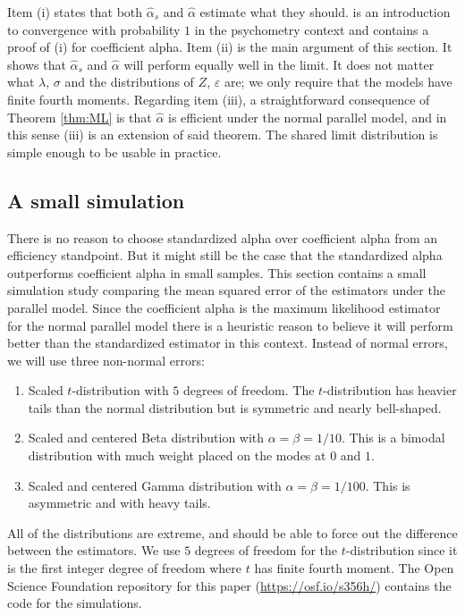 \documentclass[twoside]{article}
\begin{document}
\begin{rem}
Item (i) states that both $\hat{\alpha}_s$ and $\hat{\alpha}$ estimate what they should. \citet{Raykov2019-tv} is an introduction to convergence with probability $1$ in the psychometry context and contains a proof of (i) for coefficient alpha. Item (ii) is the main argument of this section. It shows that $\hat{\alpha}_{s}$ and $\hat{\alpha}$ will perform equally well in the limit. It does not matter what $\lambda$, $\sigma$ and the distributions of $Z$, $\varepsilon$ are; we only require that the models have finite fourth moments. Regarding item (iii), a straightforward consequence of Theorem \ref{thm:ML} is that $\hat{\alpha}$ is efficient under the normal parallel model, and in this sense (iii) is an extension of said theorem. The shared limit distribution is simple enough to be usable in practice.
\end{rem}

\subsection{A small simulation}
There is no reason to choose standardized alpha over coefficient alpha from an efficiency standpoint. But it might still be the case
that the standardized alpha outperforms coefficient alpha
in small samples. This section contains a small simulation
study comparing the mean squared error of the estimators under
the parallel model. Since the coefficient alpha is the maximum likelihood
estimator for the normal parallel model there is a heuristic reason
to believe it will perform better than the standardized estimator
in this context. Instead of normal errors, we will use three non-normal
errors:

\begin{enumerate}
\item Scaled $t$-distribution with $5$ degrees of freedom. The $t$-distribution
has heavier tails than the normal distribution but is symmetric and nearly bell-shaped. 
\item Scaled and centered Beta distribution with $\alpha=\beta=1/10$. This is a bimodal distribution with much weight placed on the modes at $0$ and $1$. 
\item Scaled and centered Gamma distribution with $\alpha=\beta=1/100$. This is asymmetric and with heavy tails. 
\end{enumerate}

All of the distributions are extreme, and should be able to force out the difference between the estimators. We use $5$ degrees of freedom for the $t$-distribution since it is the first integer degree of freedom where $t$ has finite fourth moment. The Open Science Foundation repository for this paper (\url{https://osf.io/s356h/}) contains the code for the simulations.
\end{document}
